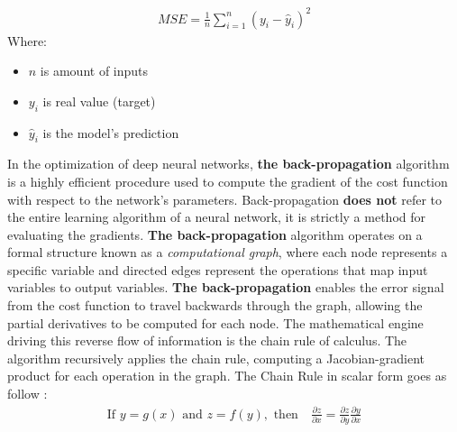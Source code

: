 \begin{itemize}
	\begin{align}
		MSE = \frac{1}{n} \sum_{i=1}^{n} (y_i - \hat{y}_i)^2
	\end{align}
	Where:
	\begin{itemize}
		\item $n$ is amount of inputs
		\item $y_i$ is real value (target)
		\item $\hat{y}_i$ is the model's prediction
	\end{itemize}
	
\end{itemize}
In the optimization of deep neural networks, \textbf{the back-propagation} algorithm is a highly efficient procedure used to compute the gradient of the cost function with respect to the network's parameters. Back-propagation \textbf{does not} refer to the entire learning algorithm of a neural network, it is strictly a method for evaluating the gradients.
\textbf{The back-propagation} algorithm operates on a formal structure known as a \textit{computational graph}, where each node represents a specific variable and directed edges represent the operations that map input variables to output variables. 
\textbf{The back-propagation} enables the error signal from the cost function to travel backwards through the graph, allowing the partial derivatives to be computed for each node. The mathematical engine driving this reverse flow of information is the chain rule of calculus. The algorithm recursively applies the chain rule, computing a Jacobian-gradient product for each operation in the graph. The Chain Rule in scalar form goes as follow \cite{Deep-Learning-book}:
\begin{align}
	\text{If } y = g(x) \text{ and } z = f(y), \text{ then} \quad
	\frac{\partial z}{\partial x} = \frac{\partial z}{\partial y} \frac{\partial y}{\partial x}
\end{align}

